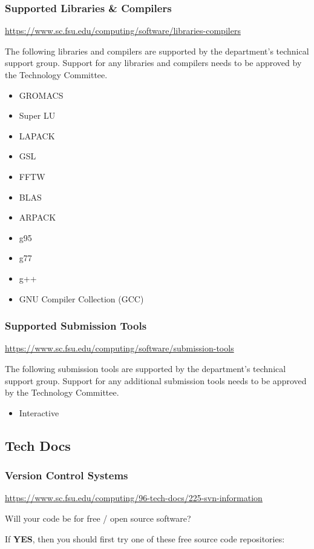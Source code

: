 \documentclass[12pt,a4paper]{article}
\begin{document}
\subsubsection{Supported Libraries \& Compilers}
\url{https://www.sc.fsu.edu/computing/software/libraries-compilers}

The following libraries and compilers are supported by the department's technical support group. Support for any libraries and compilers needs to be approved by the Technology Committee.
\begin{itemize}
    \item GROMACS
    \item Super LU
    \item LAPACK
    \item GSL
    \item FFTW
    \item BLAS
    \item ARPACK
    \item g95
    \item g77
    \item g++
    \item GNU Compiler Collection (GCC)
\end{itemize}

\subsubsection{Supported Submission Tools}
\url{https://www.sc.fsu.edu/computing/software/submission-tools}

The following submission tools are supported by the department's technical support group. Support for any additional submission tools needs to be approved by the Technology Committee.
\begin{itemize}
    \item Interactive
\end{itemize}

\subsection{Tech Docs}
\subsubsection{Version Control Systems}
\url{https://www.sc.fsu.edu/computing/96-tech-docs/225-svn-information}

Will your code be for free / open source software?

If \textbf{YES}, then you should first try one of these free source code repositories:
\end{document}

